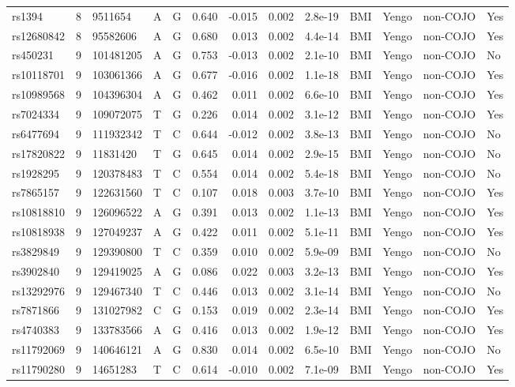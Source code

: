 \documentclass[11pt,twoside]{bristolthesis}
\begin{document}
\begin{longtable}[t]{lrlllrrrlllll}
rs1394 & 8 & 9511654 & A & G & 0.640 & -0.015 & 0.002 & 2.8e-19 & BMI & Yengo & non-COJO & Yes\\
\addlinespace
rs12680842 & 8 & 95582606 & A & G & 0.680 & 0.013 & 0.002 & 4.4e-14 & BMI & Yengo & non-COJO & Yes\\
rs450231 & 9 & 101481205 & A & G & 0.753 & -0.013 & 0.002 & 2.1e-10 & BMI & Yengo & non-COJO & No\\
rs10118701 & 9 & 103061366 & A & G & 0.677 & -0.016 & 0.002 & 1.1e-18 & BMI & Yengo & non-COJO & Yes\\
rs10989568 & 9 & 104396304 & A & G & 0.462 & 0.011 & 0.002 & 6.6e-10 & BMI & Yengo & non-COJO & Yes\\
rs7024334 & 9 & 109072075 & T & G & 0.226 & 0.014 & 0.002 & 3.1e-12 & BMI & Yengo & non-COJO & Yes\\
\addlinespace
rs6477694 & 9 & 111932342 & T & C & 0.644 & -0.012 & 0.002 & 3.8e-13 & BMI & Yengo & non-COJO & No\\
rs17820822 & 9 & 11831420 & T & G & 0.645 & 0.014 & 0.002 & 2.9e-15 & BMI & Yengo & non-COJO & No\\
rs1928295 & 9 & 120378483 & T & C & 0.554 & 0.014 & 0.002 & 5.4e-18 & BMI & Yengo & non-COJO & No\\
rs7865157 & 9 & 122631560 & T & C & 0.107 & 0.018 & 0.003 & 3.7e-10 & BMI & Yengo & non-COJO & Yes\\
rs10818810 & 9 & 126096522 & A & G & 0.391 & 0.013 & 0.002 & 1.1e-13 & BMI & Yengo & non-COJO & Yes\\
\addlinespace
rs10818938 & 9 & 127049237 & A & G & 0.422 & 0.011 & 0.002 & 5.1e-11 & BMI & Yengo & non-COJO & Yes\\
rs3829849 & 9 & 129390800 & T & C & 0.359 & 0.010 & 0.002 & 5.9e-09 & BMI & Yengo & non-COJO & No\\
rs3902840 & 9 & 129419025 & A & G & 0.086 & 0.022 & 0.003 & 3.2e-13 & BMI & Yengo & non-COJO & Yes\\
rs13292976 & 9 & 129467340 & T & C & 0.446 & 0.013 & 0.002 & 3.1e-14 & BMI & Yengo & non-COJO & No\\
rs7871866 & 9 & 131027982 & C & G & 0.153 & 0.019 & 0.002 & 2.3e-14 & BMI & Yengo & non-COJO & Yes\\
\addlinespace
rs4740383 & 9 & 133783566 & A & G & 0.416 & 0.013 & 0.002 & 1.9e-12 & BMI & Yengo & non-COJO & Yes\\
rs11792069 & 9 & 140646121 & A & G & 0.830 & 0.014 & 0.002 & 6.5e-10 & BMI & Yengo & non-COJO & No\\
rs11790280 & 9 & 14651283 & T & C & 0.614 & -0.010 & 0.002 & 7.1e-09 & BMI & Yengo & non-COJO & Yes\\

\end{longtable}
\end{document}
